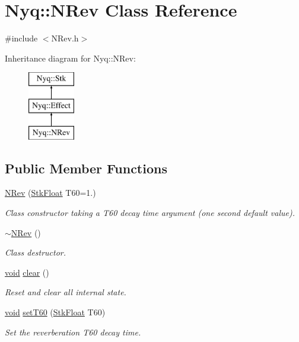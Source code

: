 \hypertarget{class_nyq_1_1_n_rev}{}\section{Nyq\+:\+:N\+Rev Class Reference}
\label{class_nyq_1_1_n_rev}


{\ttfamily \#include $<$N\+Rev.\+h$>$}

Inheritance diagram for Nyq\+:\+:N\+Rev\+:\begin{figure}[H]
\begin{center}
\leavevmode
\includegraphics[height=3.000000cm]{class_nyq_1_1_n_rev}
\end{center}
\end{figure}
\subsection*{Public Member Functions}
\begin{DoxyCompactItemize}
\item 
\hyperlink{class_nyq_1_1_n_rev_a0ba02884d88b41a819c9ea4e58e5415d}{N\+Rev} (\hyperlink{namespace_nyq_a044fa20a706520a617bbbf458a7db7e4}{Stk\+Float} T60=1.)
\begin{DoxyCompactList}\small\item\em Class constructor taking a T60 decay time argument (one second default value). \end{DoxyCompactList}\item 
\hyperlink{class_nyq_1_1_n_rev_a76af57241d165db19a43b7e668ecaeb3}{$\sim$\+N\+Rev} ()
\begin{DoxyCompactList}\small\item\em Class destructor. \end{DoxyCompactList}\item 
\hyperlink{sound_8c_ae35f5844602719cf66324f4de2a658b3}{void} \hyperlink{class_nyq_1_1_n_rev_a4d75f467b4c612b44e0dc2513d7b45d3}{clear} ()
\begin{DoxyCompactList}\small\item\em Reset and clear all internal state. \end{DoxyCompactList}\item 
\hyperlink{sound_8c_ae35f5844602719cf66324f4de2a658b3}{void} \hyperlink{class_nyq_1_1_n_rev_a74f7ea5f16e62400326ef477a5c6394c}{set\+T60} (\hyperlink{namespace_nyq_a044fa20a706520a617bbbf458a7db7e4}{Stk\+Float} T60)
\begin{DoxyCompactList}\small\item\em Set the reverberation T60 decay time. \end{DoxyCompactList}\end{DoxyCompactItemize}
